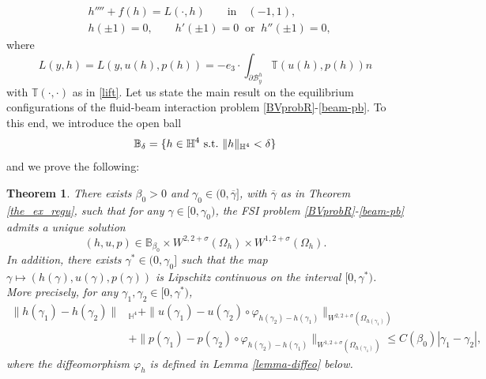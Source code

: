 \documentclass[11pt,a4paper]{amsart}
\newtheorem{theorem}[proposition]{Theorem}
\theoremstyle{remark}
\theoremstyle{definition}
\numberwithin{equation}{section}
\numberwithin{proposition}{section}
\begin{document}
    \begin{equation}\label{beam-pb}
		\begin{aligned}
			&h''''+ f(h)= L(\cdot, h)  \qquad \text{in} \quad (-1,1), \\[2pt]
			&h(\pm 1) = 0 , \qquad h'(\pm 1)=0 \ \text{ or } \ h''(\pm 1)=0,
		\end{aligned}
	\end{equation} where
    \begin{equation}\label{load}
        L(y, h)=L(y, u(h), p(h)) = - e_3 \cdot \int_{\partial \mathcal{B}_y^h}\mathbb{T}(u(h), p(h)) n
    \end{equation} with $\mathbb{T}(\cdot, \cdot)$ as in \eqref{lift}.
Let us state the main result on the equilibrium configurations of the fluid-beam interaction problem \eqref{BVprobR}-\eqref{beam-pb}. To this end, we introduce the open ball \begin{equation}\label{ballH}\mathbb{B}_\delta= \{ h \in \mathbb{H}^4 \ \text{s.t.} \ \|h\|_{\mathbb{H}^4} < \delta\}\\[5pt]\end{equation} and we prove the following:
\begin{theorem}\label{main-theo}
There exists $\beta_0>0$ and $\gamma_0\in (0, \overline{\gamma}]$, with $\overline{\gamma}$ as in Theorem \ref{the_ex_regu},  such that for any $\gamma \in [0, \gamma_0)$, the FSI problem \eqref{BVprobR}-\eqref{beam-pb} admits a unique solution $$(h, u, p)\in \mathbb{B}_{\beta_0}\times W^{2, 2+\sigma}(\Omega_h)\times W^{1, 2+\sigma}(\Omega_h).$$In addition, there exists $\gamma^*\in (0, \gamma_0]$ such that the map $\gamma\mapsto (h(\gamma), u(\gamma), p(\gamma))$ is Lipschitz continuous on the interval
$[0, \gamma^*)$. More precisely, for any $\gamma_1, \gamma_2 \in [0, \gamma^*)$,
\begin{equation*}\begin{aligned}
    \|h(\gamma_1) - h(\gamma_2)\|&_{\mathbb{H}^4} + \|u(\gamma_1) - u(\gamma_2)\circ \varphi_{h(\gamma_2)-h(\gamma_1)}\|_{W^{2, 2+\sigma}(\Omega_{h(\gamma_1)})} \\[5pt]&+ \|p(\gamma_1) - p(\gamma_2)\circ \varphi_{h(\gamma_2)-h(\gamma_1)}\|_{W^{1, 2+\sigma}(\Omega_{h(\gamma_1)})}\leq C(\beta_0) |\gamma_1-\gamma_2|,
    \end{aligned}
\end{equation*}
where the diffeomorphism $\varphi_h$ is defined in Lemma \ref{lemma-diffeo} below.

\end{theorem}\smallskip
\end{document}
